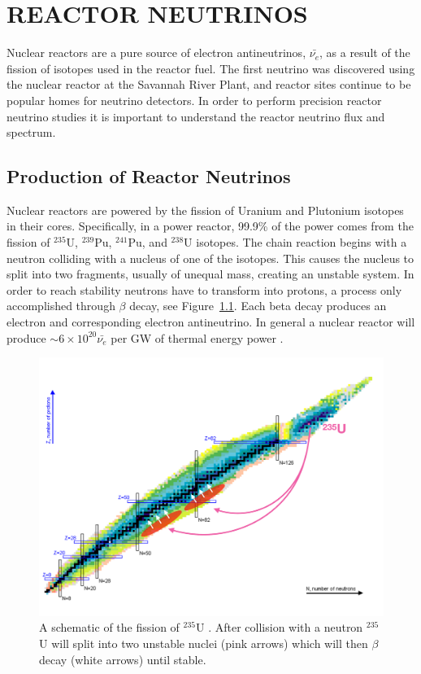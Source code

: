 \chapter{\uppercase{Reactor Neutrinos}}

Nuclear reactors are a pure source of electron antineutrinos, $\bar{\nu_e}$, as a result of the fission of isotopes used in the reactor fuel. The first neutrino was discovered using the nuclear reactor at the Savannah River Plant, and reactor sites continue to be popular homes for neutrino detectors. 
In order to perform precision reactor neutrino studies it is important to understand the reactor neutrino flux and spectrum.

\section{Production of Reactor Neutrinos}

Nuclear reactors are powered by the fission of Uranium and Plutonium isotopes in their cores. 
Specifically, in a power reactor, 99.9\% of the power comes from the fission of $^{235}$U, $^{239}$Pu, $^{241}$Pu, and $^{238}$U isotopes. 
The chain reaction begins with a neutron colliding with a nucleus of one of the isotopes. 
This causes the nucleus to split into two fragments, usually of unequal mass, creating an unstable system.
In order to reach stability neutrons have to transform into protons, a process only accomplished through $\beta$ decay, see Figure~\ref{fig:nucchart}.
Each beta decay produces an electron and corresponding electron antineutrino. 
In general a nuclear reactor will produce $\sim 6 \times 10^{20} \bar{\nu_e}$ per GW of thermal energy power \cite{HayesVogel}.

\begin{figure}[h]
	\centering
	\includegraphics[width=0.75\linewidth]{tex/3-reactorneutrinos-images/NuclideChart_U235}
	\caption{A schematic of the fission of $^{235}$U \cite{NucChart}. After collision with a neutron $^{235}$U will split into two unstable nuclei (pink arrows) which will then $\beta$ decay (white arrows) until stable.}
	\label{fig:nucchart}
\end{figure}


